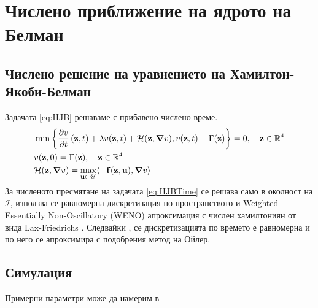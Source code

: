 \section{Числено приближение на ядрото на Белман}
\subsection{Числено решение на уравнението на Хамилтон-Якоби-Белман}
Задачата \eqref{eq:HJB} решаваме с прибавено числено време.
\begin{equation}
  \label{eq:HJBTime}
  \begin{split}
    &\min\left\{\pdv{v}{t}\left(\mathbf{z}, t\right) + \lambda v(\mathbf{z}, t) + \mathcal{H}(\mathbf{z}, \grad{v}), v(\mathbf{z}, t) - \Gamma(\mathbf{z})\right\} = 0, \quad \mathbf{z} \in \mathbb{R}^4 \\
    &v(\mathbf{z}, 0) = \Gamma(\mathbf{z}), \quad \mathbf{z} \in \mathbb{R}^4 \\
    &\mathcal{H}(\mathbf{z}, \grad{v}) = \max_{\mathbf{u} \in \mathscr{U}} \langle -\mathbf{f}(\mathbf{z}, \mathbf{u}), \grad{v} \rangle
  \end{split}
\end{equation}
За численото пресмятане на задачата \eqref{eq:HJBTime} се решава само в околност на $\mathscr{I}$, използва се равномерна дискретизация по пространството и Weighted Essentially Non-Oscillatory (WENO) \cite[глава~3.4]{Osher2003} апроксимация с числен хамилтониян от вида Lax-Friedrichs \cite[глава~5.3]{Osher2003}
. Следвайки \cite[глава~3.5]{Osher2003}, се дискретизацията по времето е равномерна и по него се апроксимира с подобрения метод на Ойлер.

\subsection{Симулация}
Примерни параметри може да намерим в \cite{Agusto2019}
